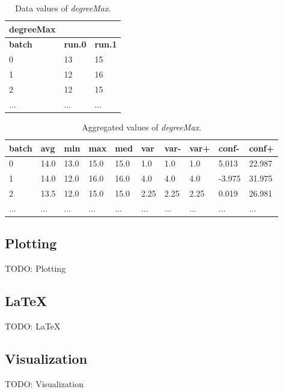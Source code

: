 \begin{table}[h]
\centering
\begin{tabular}[h]{|l|l|l|}\hline
	\textbf{degreeMax} & &\\
	\hline
	\textbf{batch} & \textbf{run.0} & \textbf{run.1}\\
	\hline
	0 & 13 & 15\\
	\hline
	1 & 12 & 16\\
	\hline
	2 & 12 & 15\\
	\hline
	... & ... & ... \\
	\hline
\end{tabular}
\caption{Data values of \textit{degreeMax}.}
\label{tab:degreemax-data}
\end{table}
\begin{table}[h]
\centering
\begin{tabular}[h]{|l|l|l|l|l|l|l|l|l|l|}\hline
	\textbf{batch} & \textbf{avg} & \textbf{min} & \textbf{max} & \textbf{med} & \textbf{var} & \textbf{var-} & \textbf{var+} & \textbf{conf-} & \textbf{conf+}\\
	\hline
	0 & 14.0 & 13.0 & 15.0 & 15.0 & 1.0 & 1.0 & 1.0 & 5.013 & 22.987\\
	\hline
	1 & 14.0 & 12.0 & 16.0 & 16.0 & 4.0 & 4.0 & 4.0 & -3.975 & 31.975\\
	\hline
	2 & 13.5 & 12.0 & 15.0 & 15.0 & 2.25 & 2.25 & 2.25 & 0.019 & 26.981\\
	\hline
	... & ... & ... & ... & ... & ... & ... & ... & ... & ...\\
	\hline
\end{tabular}
\caption{Aggregated values of \textit{degreeMax}.}
\label{tab:degreemax-aggr}
\end{table}



\subsection{Plotting}
TODO: Plotting

\subsection{LaTeX}
TODO: LaTeX

\subsection{Visualization}
TODO: Visualization